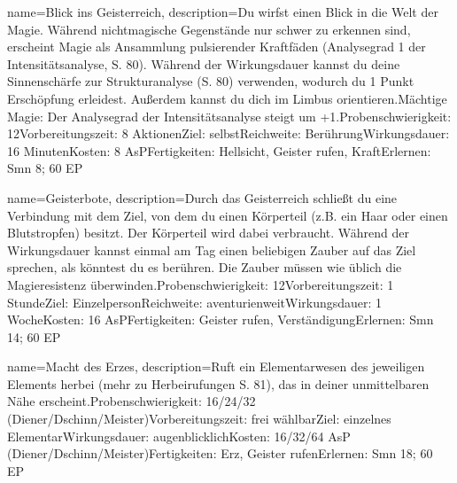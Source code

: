 {
    name={Blick ins Geisterreich},
    description={Du wirfst einen Blick in die Welt der Magie. Während nichtmagische Gegenstände nur schwer zu erkennen sind, erscheint Magie als Ansammlung pulsierender Kraftfäden (Analysegrad 1 der Intensitätsanalyse, S. 80). Während der Wirkungsdauer kannst du deine Sinnenschärfe zur Strukturanalyse (S. 80) verwenden, wodurch du 1 Punkt Erschöpfung erleidest. Außerdem kannst du dich im Limbus orientieren.\newline Mächtige Magie: Der Analysegrad der Intensitätsanalyse steigt um +1.\newline Probenschwierigkeit: 12\newline Vorbereitungszeit: 8 Aktionen\newline Ziel: selbst\newline Reichweite: Berührung\newline Wirkungsdauer: 16 Minuten\newline Kosten: 8 AsP\newline Fertigkeiten: Hellsicht, Geister rufen, Kraft\newline Erlernen: Smn 8; 60 EP}
}


{
    name={Geisterbote},
    description={Durch das Geisterreich schließt du eine Verbindung mit dem Ziel, von dem du einen Körperteil (z.B. ein Haar oder einen Blutstropfen) besitzt. Der Körperteil wird dabei verbraucht. Während der Wirkungsdauer kannst einmal am Tag einen beliebigen Zauber auf das Ziel sprechen, als könntest du es berühren. Die Zauber müssen wie üblich die Magieresistenz überwinden.\newline Probenschwierigkeit: 12\newline Vorbereitungszeit: 1 Stunde\newline Ziel: Einzelperson\newline Reichweite: aventurienweit\newline Wirkungsdauer: 1 Woche\newline Kosten: 16 AsP\newline Fertigkeiten: Geister rufen, Verständigung\newline Erlernen: Smn 14; 60 EP}
}


{
    name={Macht des Erzes},
    description={Ruft ein Elementarwesen des jeweiligen Elements herbei (mehr zu Herbeirufungen S. 81), das in deiner unmittelbaren Nähe erscheint.\newline Probenschwierigkeit: 16/24/32 (Diener/Dschinn/Meister)\newline Vorbereitungszeit: frei wählbar\newline Ziel: einzelnes Elementar\newline Wirkungsdauer: augenblicklich\newline Kosten: 16/32/64 AsP (Diener/Dschinn/Meister)\newline Fertigkeiten: Erz, Geister rufen\newline Erlernen: Smn 18; 60 EP}
}


